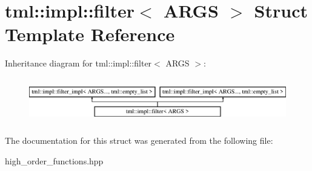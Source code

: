 \hypertarget{structtml_1_1impl_1_1filter}{\section{tml\+:\+:impl\+:\+:filter$<$ A\+R\+G\+S $>$ Struct Template Reference}
\label{structtml_1_1impl_1_1filter}
}
Inheritance diagram for tml\+:\+:impl\+:\+:filter$<$ A\+R\+G\+S $>$\+:\begin{figure}[H]
\begin{center}
\leavevmode
\includegraphics[height=2.000000cm]{structtml_1_1impl_1_1filter}
\end{center}
\end{figure}


The documentation for this struct was generated from the following file\+:\begin{DoxyCompactItemize}
\item 
high\+\_\+order\+\_\+functions.\+hpp\end{DoxyCompactItemize}
